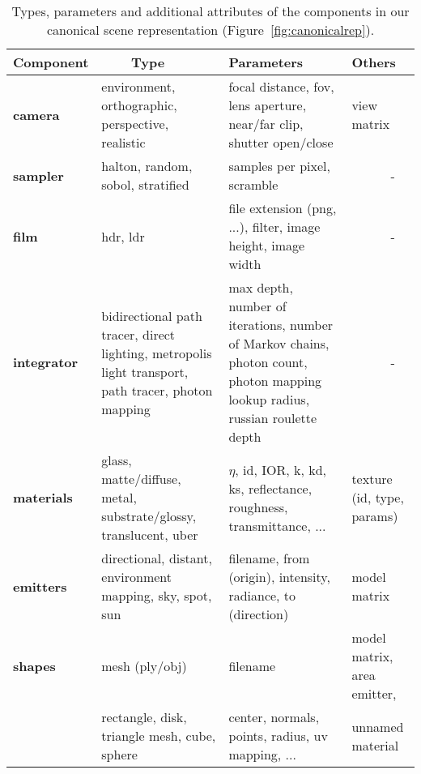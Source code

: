 
\begin{table}
  \begin{center}
      \begin{tabular}{ | L{2.5cm} | L{4cm} | L{4.2cm} | L{2.4cm} | }
      \hline
      {\bf Component} & {\bf ~~~~Type} & {\bf Parameters} & {\bf Others} \\ 
      \hline
      {\bf camera} & environment, orthographic, perspective, realistic & focal distance, fov, lens aperture, near/far clip, shutter open/close & view matrix \\
      \hline
      {\bf sampler} & halton, random, sobol, stratified & samples per pixel, scramble & ~~~~~~- \\
      \hline
      {\bf film} & hdr, ldr & file extension (png, ...), filter, image height, image width & ~~~~~~- \\
      \hline
      {\bf integrator} & bidirectional path tracer, direct lighting, metropolis light transport, path tracer, photon mapping & max depth, number of iterations, number of Markov chains, photon count, photon mapping lookup radius, russian roulette depth & ~~~~~~- \\
      \hline
      {\bf materials} & glass, matte/diffuse, metal, substrate/glossy, translucent, uber & $\eta$, id, IOR, k, kd, ks, reflectance, roughness, transmittance, ... & texture (id, type, params) \\ 
      \hline
      {\bf emitters} & directional, distant, environment mapping, sky, spot, sun & filename, from (origin), intensity, radiance, to (direction) & model matrix \\
      \hline
      {\bf shapes} & mesh (ply/obj) & filename & model matrix, area emitter, \\
	    & rectangle, disk, triangle mesh, cube, sphere & center, normals, points, radius, uv mapping, ... & unnamed material\\
      \hline

      \end{tabular}
  \end{center}
    \caption{Types, parameters and additional attributes of the components in our canonical scene representation (Figure~\ref{fig:canonicalrep}).} 
    \label{tab:summary}
\end{table}
    